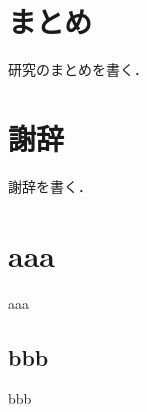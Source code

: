 \documentclass[a4paper,11pt]{jsreport}
\begin{document}


\chapter*{まとめ}
研究のまとめを書く．

\chapter*{謝辞} %
謝辞を書く．


\renewcommand{\bibname}{参考文献} %

\appendix
\renewcommand{\thechapter}{\Alph{chapter}}
\renewcommand{\thesection}{\Alph{chapter}.\arabic{section}}
\setcounter{section}{0}
\renewcommand{\theequation}{\Alph{chapter}.\arabic{equation}}
\setcounter{equation}{0}

\chapter{aaa}
aaa
\section{bbb}
bbb
\end{document}
